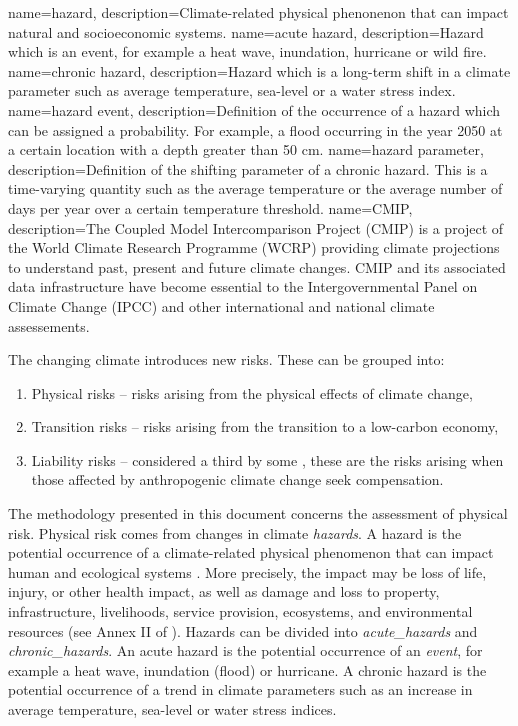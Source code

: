 \documentclass[a4paper,11pt]{extarticle} %
\theoremstyle{definition}
\begin{document}
{
    name=hazard,
    description=Climate-related physical phenonenon that can impact natural and socioeconomic systems.
}
{
    name=acute hazard,
    description={Hazard which is an event, for example a heat wave, inundation, hurricane or wild fire.}
}
{
    name=chronic hazard,
    description={Hazard which is a long-term shift in a climate parameter such as average temperature, sea-level or a water stress index.}
}
{
    name=hazard event,
    description={Definition of the occurrence of a hazard which can be assigned a probability. For example, a flood occurring in the year 2050 at a certain location with a depth greater than 50 cm.}
}
{
    name=hazard parameter,
    description=Definition of the shifting parameter of a chronic hazard. This is a time-varying quantity such as the average temperature or the average number of days per year over a certain temperature threshold.
}
{
    name=CMIP,
    description={The Coupled Model Intercomparison Project (CMIP) is a project of the World Climate Research Programme (WCRP) providing climate projections to understand past, present and future climate changes. CMIP and its associated data infrastructure have become essential to the Intergovernmental Panel on Climate Change (IPCC) and other international and national climate assessements.}
}

The changing climate introduces new risks. These can be grouped into:
\begin{enumerate}
    \item Physical risks -- risks arising from the physical effects of climate change,
    \item Transition risks -- risks arising from the transition to a low-carbon economy,
    \item Liability risks -- considered a third by some \cite{WoetzelEtAl:2020}, these are the risks arising when those affected by anthropogenic climate change seek compensation.
\end{enumerate}

The methodology presented in this document concerns the assessment of physical risk. Physical risk comes from changes in climate \emph{\gls{hazard}s}. A hazard is the potential occurrence of a climate-related physical phenomenon that can impact human and ecological systems \cite{ReisingerEtAl:2020,WoetzelEtAl:2020,MitchellEtAl:2017}. More precisely, the impact may be loss of life, injury, or other
health impact, as well as damage and loss to property, infrastructure,
livelihoods, service provision, ecosystems, and environmental resources (see Annex II of \cite{PortnerEtAl:2022}). Hazards can be divided into \emph{\gls{acute_hazard}s} and \emph{\gls{chronic_hazard}s}. An acute hazard is the potential occurrence of an \emph{event}, for example a heat wave, inundation (flood) or hurricane. A chronic hazard is the potential occurrence of a trend in climate parameters such as an increase in average temperature, sea-level or water stress indices.
\end{document}
